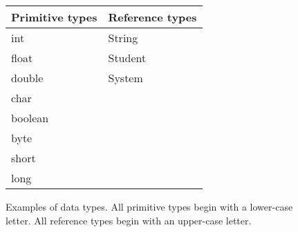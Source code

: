 




\begin {figure}


\begin {tabular}{|l|l|}
\hline
Primitive types  &       Reference types	\\
\hline
int      &                String		\\
float    &                Student		\\
double   &                System		\\
char     & \\
boolean  & \\
byte     & \\
short    & \\
long     & \\
\hline
\end{tabular}

\caption {Examples of data types.  All primitive
types begin with a lower-case letter. All reference types
begin with an upper-case letter.}
\label {fig:dataTypes}

\end {figure}


